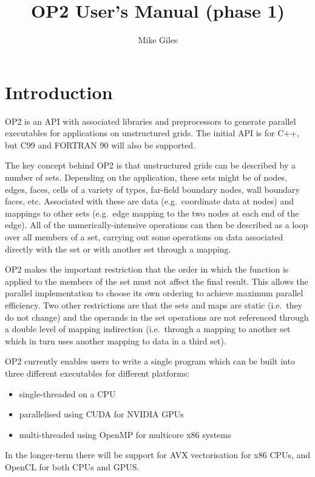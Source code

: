 \documentclass[11pt]{article}
\begin{document}
\title{OP2 User's Manual (phase 1)}
\author{Mike Giles}
\maketitle


\newpage
\section{Introduction}

OP2 is an API with associated libraries and preprocessors to generate 
parallel executables for applications on unstructured grids.  The 
initial API is for C++, but C99 and FORTRAN 90 will also be supported.

The key concept behind OP2 is that unstructured grids can be described
by a number of sets.  Depending on the application, these sets might
be of nodes, edges, faces, cells of a variety of types, far-field 
boundary nodes, wall boundary faces, etc.
Associated with these are data (e.g.~coordinate data at nodes) and 
mappings to other sets (e.g.~edge mapping to the two nodes at each 
end of the edge).  All of the numerically-intensive operations can 
then be described as a loop over all members of a set, carrying out 
some operations on data associated directly with the set or with 
another set through a mapping.   

OP2 makes the important restriction that the order in which the
function is applied to the members of the set must not affect the
final result.  This allows the parallel implementation to choose
its own ordering to achieve maximum parallel efficiency. 
Two other restrictions are that the sets and maps are static 
(i.e.~they do not change) and the operands in the set operations 
are not referenced through a double level of mapping indirection 
(i.e.~through a mapping to another set which in turn uses another 
mapping to data in a third set).

OP2 currently enables users to write a single program which can be 
built into three different executables for different platforms:
\begin{itemize}
\item
single-threaded on a CPU
\item
parallelised using CUDA for NVIDIA GPUs
\item
multi-threaded using OpenMP for multicore x86 systems
\end{itemize}

In the longer-term there will be support for AVX vectorisation for
x86 CPUs, and OpenCL for both CPUs and GPUS.
\end{document}
